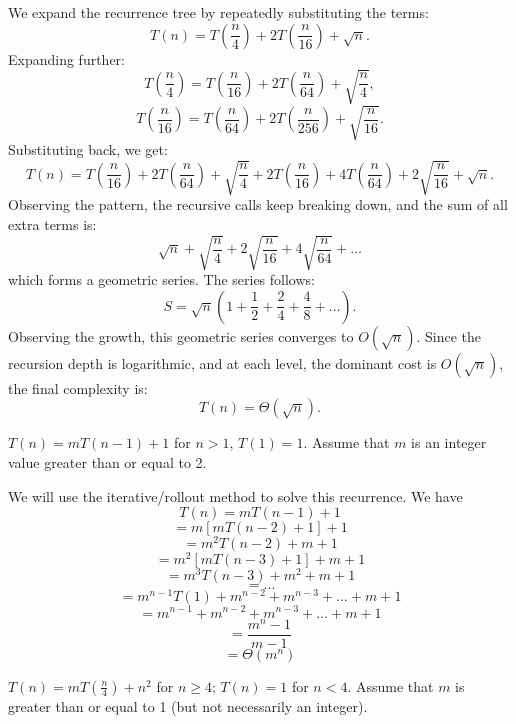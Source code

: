 \documentclass[11pt,fleqn]{exam}
\newenvironment{soln}{\color{solnblue}}{}
\newif\ifsolutions\solutionsfalse
\begin{document}
\begin{questions}
    \begin{soln}
        We expand the recurrence tree by repeatedly substituting the terms:
        \[
        T(n) = T\left(\frac{n}{4}\right) + 2T\left(\frac{n}{16}\right) + \sqrt{n}.
        \]
        Expanding further:
        \[
        T\left(\frac{n}{4}\right) = T\left(\frac{n}{16}\right) + 2T\left(\frac{n}{64}\right) + \sqrt{\frac{n}{4}},
        \]
        \[
        T\left(\frac{n}{16}\right) = T\left(\frac{n}{64}\right) + 2T\left(\frac{n}{256}\right) + \sqrt{\frac{n}{16}}.
        \]
        Substituting back, we get:
        \[
        T(n) = T\left(\frac{n}{16}\right) + 2T\left(\frac{n}{64}\right) + \sqrt{\frac{n}{4}} + 2T\left(\frac{n}{16}\right) + 4T\left(\frac{n}{64}\right) + 2\sqrt{\frac{n}{16}} + \sqrt{n}.
        \]
        Observing the pattern, the recursive calls keep breaking down, and the sum of all extra terms is:
        \[
        \sqrt{n} + \sqrt{\frac{n}{4}} + 2\sqrt{\frac{n}{16}} + 4\sqrt{\frac{n}{64}} + \dots
        \]
        which forms a geometric series.
        The series follows:
        \[
        S = \sqrt{n} \left( 1 + \frac{1}{2} + \frac{2}{4} + \frac{4}{8} + \dots \right).
        \]
        Observing the growth, this geometric series converges to \( O(\sqrt{n}) \).
        Since the recursion depth is logarithmic, and at each level, the dominant cost is \( O(\sqrt{n}) \), the final complexity is:
        \[
        T(n) = \Theta(\sqrt{n}).
        \]
    \end{soln}
    \ifsolutions\fi 

    \question[4] $T(n) = mT(n-1) + 1$ for $n > 1$, $T(1) = 1$. Assume that $m$ is an integer value greater than or equal to 2.

    \begin{soln}
        We will use the iterative/rollout method to solve this recurrence.
        We have 
        \[T(n) = mT(n-1) + 1\]
        \[= m[mT(n-2) + 1] + 1\]
        \[= m^2T(n-2) + m + 1\]
        \[= m^2[mT(n-3) + 1] + m + 1\]
        \[= m^3T(n-3) + m^2 + m + 1\]
        \[= \dots\]
        \[= m^{n-1}T(1) + m^{n-2} + m^{n-3} + \dots + m + 1\]
        \[= m^{n-1} + m^{n-2} + m^{n-3} + \dots + m + 1\]
        \[= \frac{m^n - 1}{m - 1}\]
        \[= \Theta(m^n)\]        
    \end{soln}

    \ifsolutions\fi 

    \question[4] $T(n) = mT(\frac{n}{4}) + n^2$ for $n \ge 4$; $T(n) = 1$ for $n < 4$. Assume that $m$ is greater than or equal to 1 (but not necessarily an integer).


\end{questions}
\end{document}
